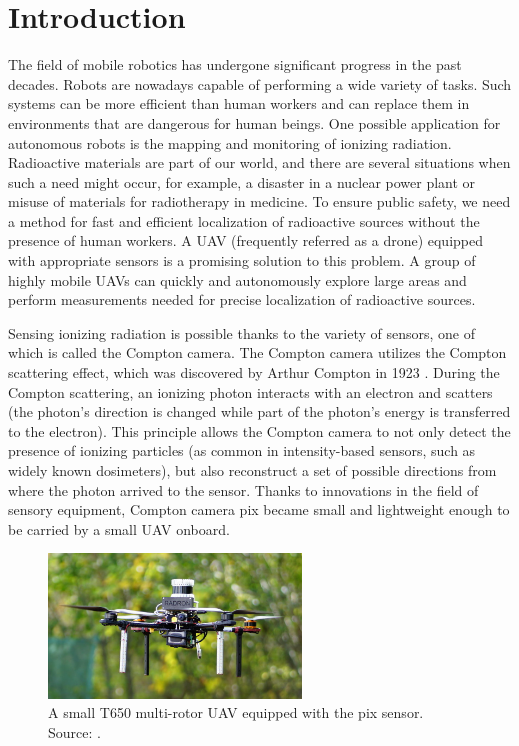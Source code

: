 \chapter{Introduction\label{chap:introduction}}
The field of mobile robotics has undergone significant progress in the past decades.
Robots are nowadays capable of performing a wide variety of tasks. 
Such systems can be more efficient than human workers and can replace them in environments that are dangerous for human beings.
One possible application for autonomous robots is the mapping and monitoring of ionizing radiation. 
Radioactive materials are part of our world, and there are several situations when such a need might occur, for example, a disaster in a nuclear power plant or misuse of materials for radiotherapy in medicine. 
To ensure public safety, we need a method for fast and efficient localization of radioactive sources without the presence of human workers.
A \ac{UAV} (frequently referred as a drone) equipped with appropriate sensors is a promising solution to this problem.
A group of highly mobile \ac{UAV}s can quickly and autonomously explore large areas and perform measurements needed for precise localization of radioactive sources.

Sensing ionizing radiation is possible thanks to the variety of sensors, one of which is called the Compton camera.
The Compton camera utilizes the Compton scattering effect, which was discovered by Arthur Compton in 1923 \cite{compton}.
During the Compton scattering, an ionizing photon interacts with an electron and scatters (the photon's direction is changed while part of the photon's energy is transferred to the electron).
This principle allows the Compton camera to not only detect the presence of ionizing particles (as common in intensity-based sensors, such as widely known dosimeters), but also reconstruct a set of possible directions from where the photon arrived to the sensor.
Thanks to innovations in the field of sensory equipment, Compton camera \ac{pix} became small and lightweight enough to be carried by a small \ac{UAV} onboard.


\begin{figure}[!h]
    \centering
  \includegraphics[width=0.6\textwidth]{./fig/photos/uav.jpg}
    \caption{A small T650 multi-rotor UAV equipped with the \ac{pix} sensor. Source: \cite{baca2021gamma}.}
    \label{fig:uavvv}
\end{figure}


